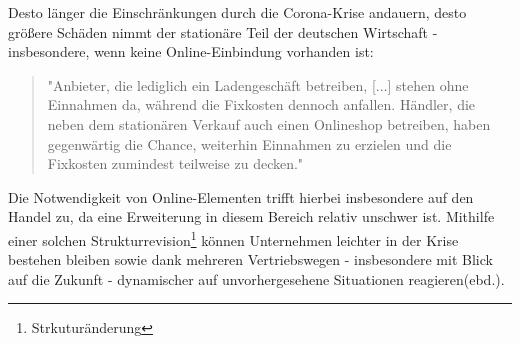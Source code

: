 \begin{folding}
Desto länger die Einschränkungen durch die Corona-Krise andauern, desto größere Schäden nimmt der stationäre Teil der deutschen Wirtschaft - insbesondere, wenn keine Online-Einbindung vorhanden ist: 
 
\begin{quote}
    "Anbieter, die lediglich ein Ladengeschäft betreiben, [...] stehen  ohne  Einnahmen  da,  während  die  Fixkosten  dennoch  anfallen.  Händler,  die  neben  dem  stationären  Verkauf  auch  einen  Onlineshop  betreiben,  haben  gegenwärtig  die  Chance,  weiterhin  Einnahmen  zu erzielen und die Fixkosten zumindest teilweise zu decken."\cite{corona-wettbewerb}
\end{quote}
Die Notwendigkeit von Online-Elementen trifft hierbei insbesondere auf den Handel zu, da eine Erweiterung in diesem Bereich relativ unschwer ist. Mithilfe einer solchen Strukturrevision\footnote{Strkuturänderung} können Unternehmen leichter in der Krise bestehen bleiben sowie dank mehreren Vertriebswegen - insbesondere mit Blick auf die Zukunft - dynamischer auf unvorhergesehene Situationen reagieren(ebd.).
 
\end{folding}




